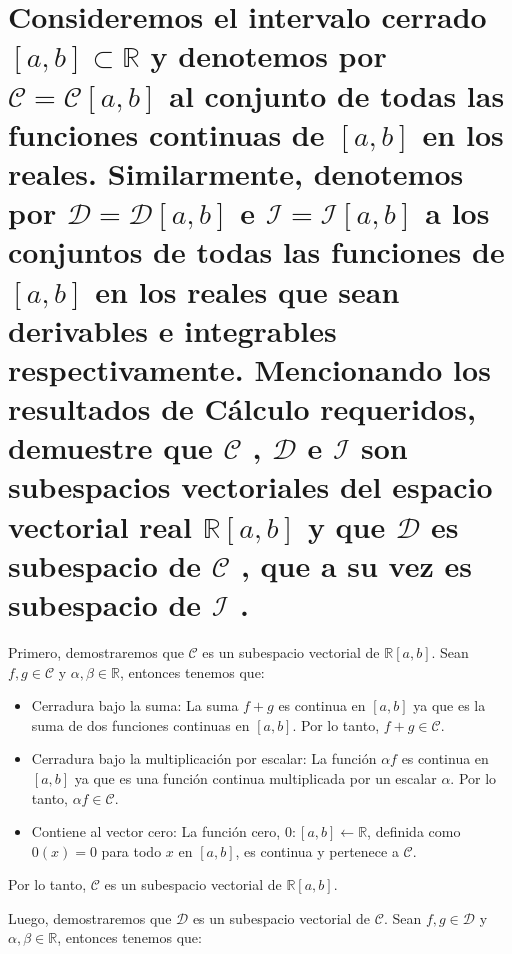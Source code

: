 \section{Consideremos el intervalo cerrado $[a, b] \subset  \mathbb{R}$ y denotemos por $\mathcal{C}  = \mathcal{C}[a, b]$ al conjunto de todas las funciones
  continuas de $[a, b]$ en los reales. Similarmente, denotemos por $\mathcal{D} = \mathcal{D}[a, b]$ e $\mathcal{I}  = \mathcal{I} [a, b]$ a los conjuntos de
  todas las funciones de $[a, b]$ en los reales que sean derivables e integrables respectivamente. Mencionando
  los resultados de Cálculo requeridos, demuestre que $\mathcal{C}$ , $\mathcal{D}$  e $\mathcal{I}$  son subespacios vectoriales del espacio
  vectorial real $\mathbb{R}[a, b]$ y que $\mathcal{D}$  es subespacio de $\mathcal{C}$ , que a su vez es subespacio de $\mathcal{I}$ .}


Primero, demostraremos que $\mathcal{C}$ es un subespacio vectorial de $\mathbb{R}[a, b]$. Sean $f , g \in \mathcal{C}$ y $\alpha,\beta \in \mathbb{R}$, entonces tenemos que:

\begin{itemize}
	\item Cerradura bajo la suma: La suma $f + g$ es continua en $[a, b]$ ya que es la suma de dos funciones continuas en $[a, b]$. Por lo tanto, $f + g \in \mathcal{C}$.
	\item Cerradura bajo la multiplicación por escalar: La función $\alpha f$ es continua en $[a, b]$ ya que es una función continua multiplicada por un escalar $\alpha$. Por lo tanto, $\alpha f \in \mathcal{C}$.
	\item Contiene al vector cero: La función cero, $0: [a, b] \leftarrow \mathbb{R}$, definida como $0(x) = 0$ para todo $x$ en $[a, b]$, es continua y pertenece a $\mathcal{C}$.
\end{itemize}

Por lo tanto, $\mathcal{C}$ es un subespacio vectorial de $\mathbb{R}[a, b]$.

Luego, demostraremos que $\mathcal{D}$ es un subespacio vectorial de $\mathcal{C}$. Sean $f, g \in \mathcal{D}$ y $\alpha, \beta \in \mathbb{R}$, entonces tenemos que:

